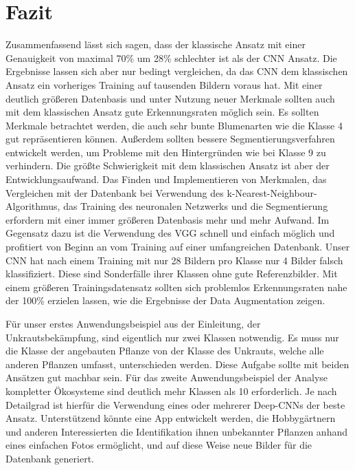 \documentclass[11pt,a4paper]{article}
\begin{document}
\section{Fazit}
Zusammenfassend lässt sich sagen, dass der klassische Ansatz mit einer Genauigkeit von maximal 70\% um 28\% schlechter ist als der CNN Ansatz. Die Ergebnisse lassen sich aber nur bedingt vergleichen, da das CNN dem klassischen Ansatz ein vorheriges Training auf tausenden Bildern voraus hat. Mit einer deutlich größeren Datenbasis und unter Nutzung neuer Merkmale sollten auch mit dem klassischen Ansatz gute Erkennungsraten möglich sein. Es sollten Merkmale betrachtet werden, die auch sehr bunte Blumenarten wie die Klasse 4 gut repräsentieren können. Außerdem sollten bessere Segmentierungsverfahren entwickelt werden, um Probleme mit den Hintergründen wie bei Klasse 9 zu verhindern. Die größte Schwierigkeit mit dem klassischen Ansatz ist aber der Entwicklungsaufwand. Das Finden und Implementieren von Merkmalen, das Vergleichen mit der Datenbank bei Verwendung des k-Nearest-Neighbour-Algorithmus, das Training des neuronalen Netzwerks und die Segmentierung erfordern mit einer immer größeren Datenbasis mehr und mehr Aufwand. Im Gegensatz dazu ist die Verwendung des VGG schnell und einfach möglich und profitiert von Beginn an vom Training auf einer umfangreichen Datenbank. Unser CNN hat nach einem Training mit nur 28 Bildern pro Klasse nur 4 Bilder falsch klassifiziert. Diese sind Sonderfälle ihrer Klassen ohne gute Referenzbilder. Mit einem größeren Trainingsdatensatz sollten sich problemlos Erkennungsraten nahe der 100\% erzielen lassen, wie die Ergebnisse der Data Augmentation zeigen.

Für unser erstes Anwendungsbeispiel aus der Einleitung, der Unkrautsbekämpfung, sind eigentlich nur zwei Klassen notwendig. Es muss nur die Klasse der angebauten Pflanze von der Klasse des Unkrauts, welche alle anderen Pflanzen umfasst, unterschieden werden. Diese Aufgabe sollte mit beiden Ansätzen gut machbar sein.
Für das zweite Anwendungsbeispiel der Analyse kompletter Ökosysteme sind deutlich mehr Klassen als 10 erforderlich. Je nach Detailgrad ist hierfür die Verwendung eines oder mehrerer Deep-CNNs der beste Ansatz. Unterstützend könnte eine App entwickelt werden, die Hobbygärtnern und anderen Interessierten die Identifikation ihnen unbekannter Pflanzen anhand eines einfachen Fotos ermöglicht, und auf diese Weise neue Bilder für die Datenbank generiert.
\end{document}
